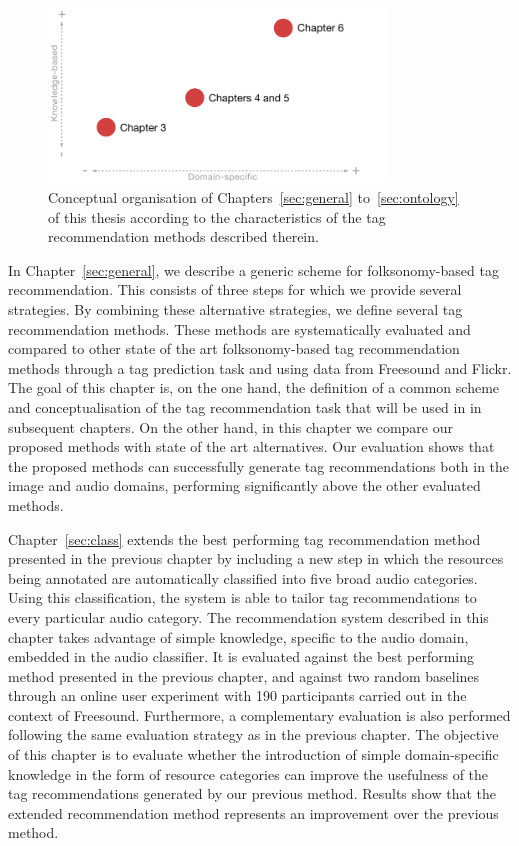 \begin{figure}[t]
  \centering
  \includegraphics[width=0.8\textwidth]{ch01_introduction/pics/chapters_diagram}
  \caption[Conceptual organisation of Chapters~\ref{sec:general} to~\ref{sec:ontology}]{Conceptual organisation of Chapters~\ref{sec:general} to~\ref{sec:ontology} of this thesis according to the characteristics of the tag recommendation methods described therein.}
  \label{fig:chapters_diagram}
\end{figure}

In Chapter~\ref{sec:general}, we describe a generic scheme for folksonomy-based tag recommendation. This consists of three steps for which we provide several strategies.
By combining these alternative strategies, we define several tag recommendation methods. These methods are systematically evaluated and compared to other state of the art folksonomy-based tag recommendation methods through a tag prediction task and using data from Freesound and Flickr. 
The goal of this chapter is, on the one hand, the definition of a common scheme and conceptualisation of the tag recommendation task that will be used in in subsequent chapters.
On the other hand, in this chapter we compare our proposed methods with state of the art alternatives.
Our evaluation shows that the proposed methods can successfully generate tag recommendations both in the image and audio domains, performing significantly above the other evaluated methods.

Chapter~\ref{sec:class} extends the best performing tag recommendation method presented in the previous chapter by including a new step in which the resources being annotated are automatically classified into five broad audio categories.
Using this classification, the system is able to tailor tag recommendations to every particular audio category.
The recommendation system described in this chapter takes advantage of simple knowledge, specific to the audio domain, embedded in the audio classifier.
It is evaluated against the best performing method presented in the previous chapter, and against two random baselines through an online user experiment with 190 participants carried out in the context of Freesound. Furthermore, a complementary evaluation is also performed following the same evaluation strategy as in the previous chapter. The objective of this chapter is to evaluate whether the introduction of simple domain-specific knowledge in the form of resource categories can improve the usefulness of the tag recommendations generated by our previous method. 
Results show that the extended recommendation method represents an improvement over the previous method.%

